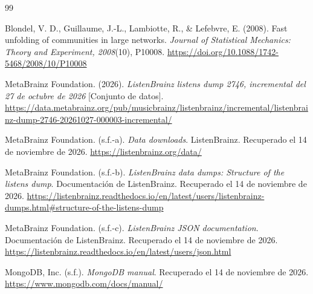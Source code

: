 \documentclass[11pt,a4paper]{article}
\begin{document}
\tableofcontents
\clearpage













\clearpage
\renewcommand{\refname}{Referencias}
{}

\begin{thebibliography}{99}

Blondel, V. D., Guillaume, J.-L., Lambiotte, R., \& Lefebvre, E. (2008).
Fast unfolding of communities in large networks.
\textit{Journal of Statistical Mechanics: Theory and Experiment, 2008}(10), P10008.
\newline
\url{https://doi.org/10.1088/1742-5468/2008/10/P10008}

MetaBrainz Foundation. (2026).
\textit{ListenBrainz listens dump 2746, incremental del 27 de octubre de 2026} [Conjunto de datos].
\newline
\url{https://data.metabrainz.org/pub/musicbrainz/listenbrainz/incremental/listenbrainz-dump-2746-20261027-000003-incremental/}

MetaBrainz Foundation. (s.f.-a).
\textit{Data downloads}. ListenBrainz. Recuperado el 14 de noviembre de 2026.
\newline
\url{https://listenbrainz.org/data/}

MetaBrainz Foundation. (s.f.-b).
\textit{ListenBrainz data dumps: Structure of the listens dump}. Documentación de ListenBrainz. Recuperado el 14 de noviembre de 2026.
\newline
\url{https://listenbrainz.readthedocs.io/en/latest/users/listenbrainz-dumps.html#structure-of-the-listens-dump}

MetaBrainz Foundation. (s.f.-c).
\textit{ListenBrainz JSON documentation}. Documentación de ListenBrainz. Recuperado el 14 de noviembre de 2026.
\newline
\url{https://listenbrainz.readthedocs.io/en/latest/users/json.html}

MongoDB, Inc. (s.f.).
\textit{MongoDB manual}. Recuperado el 14 de noviembre de 2026.
\newline
\url{https://www.mongodb.com/docs/manual/}


\end{thebibliography}
\end{document}

